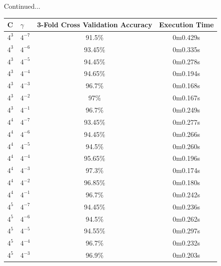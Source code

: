 \documentclass[]{report}
\begin{document}
\begin{center}
			Continued... \newline

			\begin{tabular}{l|l|c|c}
			\hline
			 C      & $\gamma$   & 3-Fold Cross Validation Accuracy   & Execution Time   \\
			\hline
			 $4^{3}$  & $4^{-7}$   & 91.5\%                              & 0m0.429s         \\
			 $4^{3}$  & $4^{-6}$   & 93.45\%                             & 0m0.335s         \\
			 $4^{3}$  & $4^{-5}$   & 94.45\%                             & 0m0.278s         \\
			 $4^{3}$  & $4^{-4}$   & 94.65\%                             & 0m0.194s         \\
			 $4^{3}$  & $4^{-3}$   & 96.7\%                              & 0m0.168s         \\
			 $4^{3}$  & $4^{-2}$   & 97\%                                & 0m0.167s         \\
			 $4^{3}$  & $4^{-1}$   & 96.7\%                              & 0m0.249s         \\
			 $4^{4}$  & $4^{-7}$   & 93.45\%                             & 0m0.277s         \\
			 $4^{4}$  & $4^{-6}$   & 94.45\%                             & 0m0.266s         \\
			 $4^{4}$  & $4^{-5}$   & 94.5\%                              & 0m0.260s         \\
			 $4^{4}$  & $4^{-4}$   & 95.65\%                             & 0m0.196s         \\
			 $4^{4}$  & $4^{-3}$   & 97.3\%                              & 0m0.174s         \\
			 $4^{4}$  & $4^{-2}$   & 96.85\%                             & 0m0.180s         \\
			 $4^{4}$  & $4^{-1}$   & 96.7\%                              & 0m0.242s         \\
			 $4^{5}$  & $4^{-7}$   & 94.45\%                             & 0m0.236s         \\
			 $4^{5}$  & $4^{-6}$   & 94.5\%                              & 0m0.262s         \\
			 $4^{5}$  & $4^{-5}$   & 94.55\%                             & 0m0.297s         \\
			 $4^{5}$  & $4^{-4}$   & 96.7\%                              & 0m0.232s         \\
			 $4^{5}$  & $4^{-3}$   & 96.9\%                              & 0m0.203s         \\

\end{tabular}
\end{center}
\end{document}
